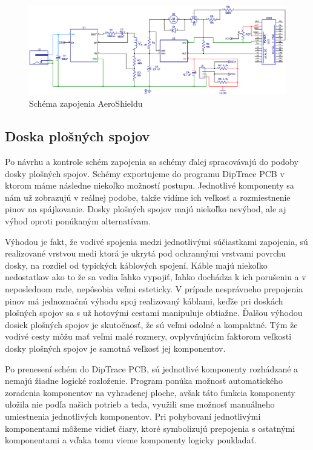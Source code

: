 \begin{figure}[!tbh]
	\includegraphics[width=\textwidth]{obr/aeroSchema.png}
	\caption{Schéma zapojenia AeroShieldu}\label{OBRAZOK 2.3.5}
\end{figure}

\subsection{Doska plošných spojov}
\label{PCBcka}

Po návrhu a kontrole schém zapojenia sa schémy ďalej spracovávajú do podoby dosky plošných spojov. Schémy exportujeme do programu DipTrace PCB v ktorom máme následne niekoľko možností postupu. Jednotlivé komponenty sa nám už zobrazujú v reálnej podobe, takže vidíme ich veľkosť a rozmiestnenie pinov na spájkovanie. Dosky plošných spojov majú niekoľko nevýhod, ale aj výhod oproti ponúkaným alternatívam\cite{dosky}. 

Výhodou je fakt, že vodivé spojenia medzi jednotlivými súčiastkami zapojenia, sú realizované vrstvou medi ktorá je ukrytá pod ochrannými vrstvami povrchu dosky, na rozdiel od typických káblových spojení. Káble majú niekoľko nedostatkov ako to že sa vedia ľahko vypojiť, ľahko dochádza k ich porušeniu a v neposlednom rade, nepôsobia veľmi esteticky. V prípade nesprávneho prepojenia pinov má jednoznačnú výhodu spoj realizovaný káblami, keďže pri doskách plošných spojov sa s už hotovými cestami manipuluje obtiažne. Ďalšou výhodou dosiek plošných spojov je skutočnosť, že sú veľmi odolné a kompaktné. Tým že vodivé cesty môžu mať veľmi malé rozmery, ovplyvňujúcim faktorom veľkosti dosky plošných spojov je samotná veľkosť jej komponentov. 

Po prenesení schém do DipTrace PCB, sú jednotlivé komponenty rozhádzané a nemajú žiadne logické rozloženie. Program ponúka možnosť automatického zoradenia komponentov na vyhradenej ploche, avšak táto funkcia komponenty uložila nie podľa našich potrieb a teda, využili sme možnosť manuálneho umiestnenia jednotlivých komponentov. Pri pohybovaní jednotlivými komponentami môžeme vidieť čiary, ktoré symbolizujú prepojenia s ostatnými komponentami a vďaka tomu vieme komponenty logicky poukladať.

